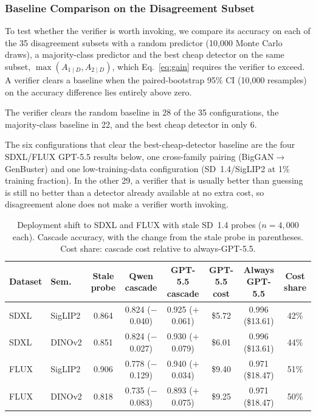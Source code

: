 \documentclass{ieeeaccess}
\begin{document}
\subsubsection{Baseline Comparison on the Disagreement Subset}
\label{sec:baseline_comparison}

To test whether the verifier is worth invoking, we compare its accuracy on each of the 35 disagreement subsets with a random predictor (10{,}000 Monte Carlo draws), a majority-class predictor and the best cheap detector on the same subset, $\max(A_{1\mid D}, A_{2\mid D})$, which Eq.~\eqref{eq:gain} requires the verifier to exceed. A verifier clears a baseline when the paired-bootstrap 95\% CI (10{,}000 resamples) on the accuracy difference lies entirely above zero.

The verifier clears the random baseline in 28 of the 35 configurations, the
majority-class baseline in 22, and the best cheap detector in only 6.

The six configurations that clear the best-cheap-detector baseline are the four SDXL/FLUX GPT-5.5 results below, one cross-family pairing (BigGAN$\to$GenBuster) and one low-training-data configuration (SD~1.4/SigLIP2 at 1\% training fraction). In the other 29, a verifier that is usually better than guessing is still no better than a detector already available at no extra cost, so disagreement alone does not make a verifier worth invoking.

\begin{table}[t]
\centering
\footnotesize
\setlength{\tabcolsep}{3pt}
\caption{Deployment shift to SDXL and FLUX with stale SD~1.4 probes ($n{=}4{,}000$ each). Cascade accuracy, with the change from the stale probe in parentheses. Cost share: cascade cost relative to always-GPT-5.5.}
\label{tab:e8_results}
\begin{tabular}{llcccccc}
\toprule
Dataset & Sem. & Stale probe & Qwen cascade & GPT-5.5 cascade & GPT-5.5 cost & Always GPT-5.5 & Cost share \\
\midrule
SDXL & SigLIP2 & 0.864 & 0.824 ($-$0.040) & 0.925 ($+$0.061) & \$5.72 & 0.996 (\$13.61) & 42\% \\
SDXL & DINOv2 & 0.851 & 0.824 ($-$0.027) & 0.930 ($+$0.079) & \$6.01 & 0.996 (\$13.61) & 44\% \\
FLUX & SigLIP2 & 0.906 & 0.778 ($-$0.129) & 0.940 ($+$0.034) & \$9.40 & 0.971 (\$18.47) & 51\% \\
FLUX & DINOv2 & 0.818 & 0.735 ($-$0.083) & 0.893 ($+$0.075) & \$9.25 & 0.971 (\$18.47) & 50\% \\
\bottomrule
\end{tabular}
\end{table}
\end{document}
